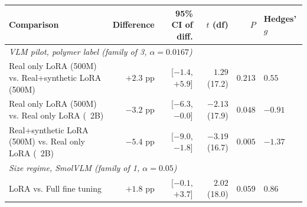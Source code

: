 \begin{table}[H]
\centering
\footnotesize
\renewcommand{\arraystretch}{1.2}
\begin{tabular}{lrrrrl}
\toprule
\textbf{Comparison} & \textbf{Difference} & \textbf{95\% CI of diff.} & \textbf{$t$ (df)} & \textbf{$P$} & \textbf{Hedges' $g$} \\
\midrule
\multicolumn{6}{l}{\textit{VLM pilot, polymer label (family of 3, $\alpha=0.0167$)}} \\
Real only LoRA (500M) vs. Real+synthetic LoRA (500M) & $+2.3$ pp & [$-1.4$, $+5.9$] & $1.29$ (17.2) & $0.213$ & $0.55$ \\
Real only LoRA (500M) vs. Real only LoRA (~2B) & $-3.2$ pp & [$-6.3$, $-0.0$] & $-2.13$ (17.9) & $0.048$ & $-0.91$ \\
Real+synthetic LoRA (500M) vs. Real only LoRA (~2B) & $-5.4$ pp & [$-9.0$, $-1.8$] & $-3.19$ (16.7) & $\mathbf{0.005}$ & $-1.37$ \\
\midrule
\multicolumn{6}{l}{\textit{Size regime, SmolVLM (family of 1, $\alpha=0.05$)}} \\
LoRA vs. Full fine tuning & $+1.8$ pp & [$-0.1$, $+3.7$] & $2.02$ (18.0) & $0.059$ & $0.86$ \\
\bottomrule
\end{tabular}
\end{table}